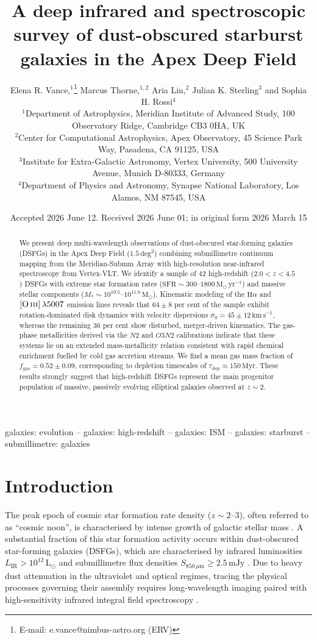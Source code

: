 \documentclass[fleqn,usenatbib]{mnras}
\title[Dust-obscured starbursts in the Apex Field]{A deep infrared and spectroscopic survey of dust-obscured starburst galaxies in the Apex Deep Field}
\author[E. R. Vance et al.]{
Elena R. Vance,$^{1}$\thanks{E-mail: e.vance@nimbus-astro.org (ERV)}
Marcus Thorne,$^{1,2}$
Aria Lin,$^{2}$
Julian K. Sterling$^{3}$
and Sophia H. Rossi$^{4}$
\\
$^{1}$Department of Astrophysics, Meridian Institute of Advanced Study, 100 Observatory Ridge, Cambridge CB3 0HA, UK\\
$^{2}$Center for Computational Astrophysics, Apex Observatory, 45 Science Park Way, Pasadena, CA 91125, USA\\
$^{3}$Institute for Extra-Galactic Astronomy, Vertex University, 500 University Avenue, Munich D-80333, Germany\\
$^{4}$Department of Physics and Astronomy, Synapse National Laboratory, Los Alamos, NM 87545, USA
}
\date{Accepted 2026 June 12. Received 2026 June 01; in original form 2026 March 15}
\newcommand{\mJy}{\,\mathrm{mJy}}
\newcommand{\kms}{\,\mathrm{km\,s}^{-1}}
\newcommand{\Msun}{\,\mathrm{M}_\odot}
\newcommand{\Lsun}{\,\mathrm{L}_\odot}
\begin{document}
\label{firstpage}
\pagerange{\pageref{firstpage}--\pageref{lastpage}}
\maketitle

\begin{abstract}
We present deep multi-wavelength observations of dust-obscured star-forming galaxies (DSFGs) in the Apex Deep Field ($1.5\,\mathrm{deg}^2$) combining submillimetre continuum mapping from the Meridian-Submm Array with high-resolution near-infrared spectroscopy from Vertex-VLT. We identify a sample of 42 high-redshift ($2.0 < z < 4.5$) DSFGs with extreme star formation rates ($\mathrm{SFR} \sim 300\text{--}1800\Msun\,\mathrm{yr}^{-1}$) and massive stellar components ($M_* \sim 10^{10.5}\text{--}10^{11.8}\Msun$). Kinematic modeling of the $\mathrm{H}\alpha$ and $[\mathrm{O\,\textsc{iii}}]\,\lambda 5007$ emission lines reveals that $64 \pm 8$ per cent of the sample exhibit rotation-dominated disk dynamics with velocity dispersions $\sigma_0 = 45 \pm 12\kms$, whereas the remaining $36$ per cent show disturbed, merger-driven kinematics. The gas-phase metallicities derived via the $N2$ and $O3N2$ calibrations indicate that these systems lie on an extended mass-metallicity relation consistent with rapid chemical enrichment fuelled by cold gas accretion streams. We find a mean gas mass fraction of $f_{\mathrm{gas}} = 0.52 \pm 0.09$, corresponding to depletion timescales of $\tau_{\mathrm{dep}} \approx 150\,\mathrm{Myr}$. These results strongly suggest that high-redshift DSFGs represent the main progenitor population of massive, passively evolving elliptical galaxies observed at $z \sim 2$.
\end{abstract}

\begin{keywords}
galaxies: evolution -- galaxies: high-redshift -- galaxies: ISM -- galaxies: starburst -- submillimetre: galaxies
\end{keywords}

\section{Introduction}
\label{sec:intro}

The peak epoch of cosmic star formation rate density ($z \sim 2\text{--}3$), often referred to as ``cosmic noon'', is characterised by intense growth of galactic stellar mass \citep{Madau2014, Sterling2021}. A substantial fraction of this star formation activity occurs within dust-obscured star-forming galaxies (DSFGs), which are characterised by infrared luminosities $L_{\mathrm{IR}} > 10^{12}\Lsun$ and submillimetre flux densities $S_{850\,\mu\mathrm{m}} \ge 2.5\mJy$ \citep{Vance2020, Thorne2023}. Due to heavy dust attenuation in the ultraviolet and optical regimes, tracing the physical processes governing their assembly requires long-wavelength imaging paired with high-sensitivity infrared integral field spectroscopy \citep{Lin2022}.
\end{document}
